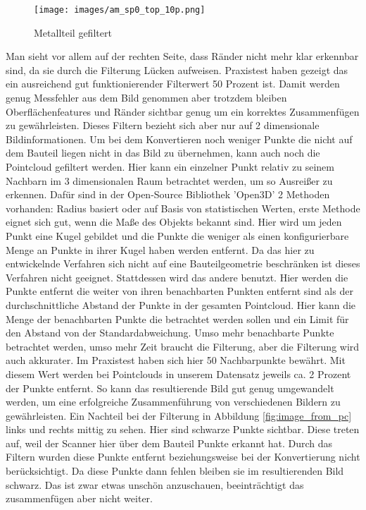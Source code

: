 \documentclass[../main.tex]{subfiles}
\begin{document}
\begin{figure}
    \centering
    \texttt{[image: images/am\_sp0\_top\_10p.png]}
    \caption{Metallteil gefiltert}\label{fig:metall_image}
\end{figure}

Man sieht vor allem auf der rechten Seite, dass Ränder nicht mehr klar erkennbar sind, 
da sie durch die Filterung Lücken aufweisen. Praxistest haben gezeigt das ein 
ausreichend gut funktionierender Filterwert 50 Prozent ist. Damit werden genug 
Messfehler aus dem Bild genommen aber trotzdem bleiben Oberflächenfeatures und Ränder
sichtbar genug um ein korrektes Zusammenfügen zu gewährleisten.
Dieses Filtern bezieht sich aber nur auf 2 dimensionale Bildinformationen.
Um bei dem Konvertieren noch weniger Punkte die nicht auf dem Bauteil liegen nicht in das Bild zu übernehmen, kann auch noch die Pointcloud gefiltert werden.
Hier kann ein einzelner Punkt relativ zu seinem Nachbarn im 3 dimensionalen Raum betrachtet werden, 
um so Ausreißer zu erkennen. Dafür sind in der Open-Source
Bibliothek 'Open3D' 2 Methoden vorhanden: Radius basiert oder auf Basis von 
statistischen Werten, erste Methode eignet sich gut, wenn die Maße des Objekts bekannt
sind. Hier wird um jeden Punkt eine Kugel gebildet und die Punkte die weniger als 
einen konfigurierbare Menge an Punkte in ihrer Kugel haben werden entfernt. Da 
das hier zu entwickelnde Verfahren sich nicht auf eine Bauteilgeometrie beschränken
ist dieses Verfahren nicht geeignet. Stattdessen wird das andere benutzt. Hier werden
die Punkte entfernt die weiter von ihren benachbarten Punkten entfernt sind als der 
durchschnittliche Abstand der Punkte in der gesamten Pointcloud. Hier kann die Menge der 
benachbarten Punkte die betrachtet werden sollen und ein Limit für den Abstand von der 
Standardabweichung. Umso mehr benachbarte Punkte betrachtet werden, umso mehr Zeit 
braucht die Filterung, aber die Filterung wird auch akkurater. Im Praxistest haben sich
hier 50 Nachbarpunkte bewährt. Mit diesem Wert werden bei Pointclouds in unserem 
Datensatz jeweils ca. 2 Prozent der Punkte entfernt. So kann das resultierende
Bild gut genug umgewandelt werden, um eine erfolgreiche Zusammenführung 
von verschiedenen Bildern zu gewährleisten.
Ein Nachteil bei der Filterung in Abbildung \ref{fig:image_from_pc} links und rechts 
mittig zu sehen. Hier sind schwarze Punkte sichtbar. Diese treten auf, weil der Scanner
hier über dem Bauteil Punkte erkannt hat. Durch das Filtern wurden diese Punkte entfernt
beziehungsweise bei der Konvertierung nicht berücksichtigt. Da diese Punkte dann fehlen
bleiben sie im resultierenden Bild schwarz. Das ist zwar etwas unschön anzuschauen, 
beeinträchtigt das zusammenfügen aber nicht weiter. 
\end{document}
